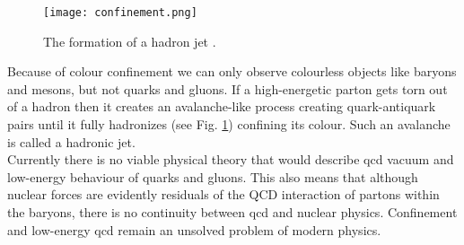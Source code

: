 	 \begin{figure}[htpb]
	 	\centering
	\texttt{[image: confinement.png]}
	\caption{The formation of a hadron jet \cite{conf_wiki}. }
	\label{fig::jet}
	\end{figure}
Because of colour confinement we can only observe colourless objects like baryons and mesons, but not quarks and gluons. If a high-energetic parton gets torn out of a hadron then it creates an avalanche-like process creating quark-antiquark pairs until it fully hadronizes (see Fig. \ref{fig::jet}) confining its colour. Such an avalanche is called a hadronic jet. \\
Currently there is no viable physical theory that would describe \gls{qcd} vacuum and low-energy behaviour of quarks and gluons. This also means that although nuclear forces are evidently residuals of the QCD interaction of partons within the baryons, there is no continuity between \gls{qcd} and nuclear physics. Confinement and low-energy \gls{qcd} remain an unsolved problem of modern physics. 


